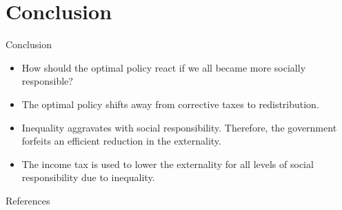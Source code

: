 \documentclass[11pt,aspectratio=169]{beamer}
\begin{document}
	\section{Conclusion}
	
	\begin{frame}{Conclusion}
		
		\begin{itemize}[<+-| alert@+>]
			\item How should the optimal policy react if we all became  more socially responsible?
			\vspace{4mm}
			\item The optimal policy shifts away from corrective taxes to redistribution. %
			\vspace{4mm}
			\item Inequality aggravates with social responsibility. Therefore, the government forfeits an efficient reduction in the externality. %
			\vspace{4mm}
			\item The income tax is used to lower the externality for all levels of social responsibility due to inequality.
		\end{itemize}
	\end{frame}
	
	\appendix
	

	
	\begin{frame}[allowframebreaks]{References}
		
		
		
	\end{frame}
	
	
	
\end{document}

